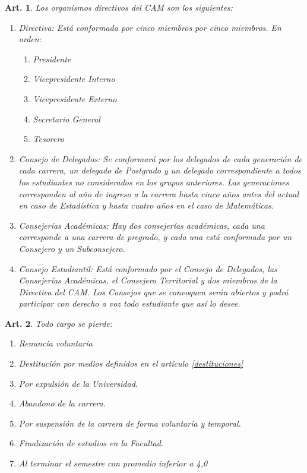 \documentclass[letterpaper,11pt]{article}
\theoremstyle{plain}
\newtheorem{art}{Art.} %
\begin{document}
\begin{art}\label{definicionesOrganismos}
	Los organismos directivos del CAM son los siguientes:
	\begin{enumerate}
		\item Directiva: Está conformada por cinco miembros por cinco miembros. En orden:
		\begin{enumerate}
			\item Presidente
			\item Vicepresidente Interno
			\item Vicepresidente Externo
			\item Secretario General
			\item Tesorero
		\end{enumerate}
		\item Consejo de Delegados: Se conformará por los delegados de cada generación de cada carrera, un delegado de Postgrado y un delegado correspondiente a todos los estudiantes no considerados en los grupos anteriores. Las generaciones corresponden al año de ingreso a la carrera hasta cinco años antes del actual en caso de Estadística y hasta cuatro años en el caso de Matemáticas.
		\item Consejerías Académicas: Hay dos consejerías académicas, cada una corresponde a una carrera de pregrado, y cada una está conformada por un Consejero y un Subconsejero.
		\item Consejo Estudiantil: Está conformado por el Consejo de Delegados, las Consejerías Académicas, el Consejero Territorial y dos miembros de la Directiva del CAM. Los Consejos que se convoquen serán abiertos y podrá participar con derecho a voz todo estudiante que así lo desee.
	\end{enumerate}
\end{art}

\begin{art}
	Todo cargo se pierde:
	\begin{enumerate}
		\item Renuncia voluntaria
		\item Destitución por medios definidos en el artículo \ref{destituciones}
		\item Por expulsión de la Universidad.
		\item Abandono de la carrera.
		\item Por suspensión de la carrera de forma voluntaria y temporal.
		\item Finalización de estudios en la Facultad.
		\item Al terminar el semestre con promedio inferior a 4,0
	\end{enumerate}
\end{art}
\end{document}
